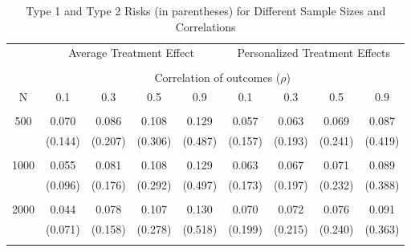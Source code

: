 \begin{table}[H]
\centering
\begin{tabular}{c||cccc|cccc}
\hline\hline
& \multicolumn{4}{c|}{Average Treatment Effect} & \multicolumn{4}{c}{Personalized Treatment Effects} \\
\cline{2-9}
\\
& \multicolumn{8}{c}{Correlation of outcomes ($\rho$)} \\
\cline{2-9}
N & 0.1 & 0.3 & 0.5 & 0.9 & 0.1 & 0.3 & 0.5 & 0.9 \\
\hline
\\
500 & 0.070 & 0.086 & 0.108 & 0.129 & 0.057 & 0.063 & 0.069 & 0.087 \\
& (0.144) & (0.207) & (0.306) & (0.487) & (0.157) & (0.193) & (0.241) & (0.419) \\
\\
1000 & 0.055 & 0.081 & 0.108 & 0.129 & 0.063 & 0.067 & 0.071 & 0.089 \\
& (0.096) & (0.176) & (0.292) & (0.497) & (0.173) & (0.197) & (0.232) & (0.388) \\
\\
2000 & 0.044 & 0.078 & 0.107 & 0.130 & 0.070 & 0.072 & 0.076 & 0.091 \\
& (0.071) & (0.158) & (0.278) & (0.518) & (0.199) & (0.215) & (0.240) & (0.363) \\
\\
\hline\hline
\end{tabular}
\caption{Type 1 and Type 2 Risks (in parentheses) for Different Sample Sizes and Correlations}
\label{tab:risks}
\end{table}
